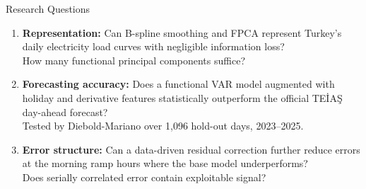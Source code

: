 \documentclass[10pt,aspectratio=169]{beamer}
\begin{document}
\begin{frame}{Research Questions}
  \begin{enumerate}
    \item \textbf{Representation:} Can B-spline smoothing and FPCA represent
          Turkey's daily electricity load curves with negligible information loss?\\
          {\small How many functional principal components suffice?}

    \vspace{0.5em}
    \item \textbf{Forecasting accuracy:} Does a functional VAR model augmented
          with holiday and derivative features statistically outperform the
          official TEİAŞ day-ahead forecast?\\
          {\small Tested by Diebold-Mariano over 1,096 hold-out days, 2023--2025.}

    \vspace{0.5em}
    \item \textbf{Error structure:} Can a data-driven residual correction further
          reduce errors at the morning ramp hours where the base model underperforms?\\
          {\small Does serially correlated error contain exploitable signal?}
  \end{enumerate}
\end{frame}
\end{document}

